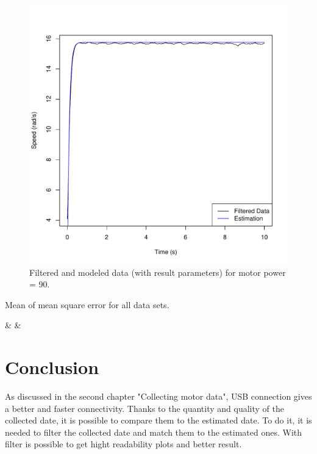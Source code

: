 \documentclass[a4paper,12pt,oneside]{article}
\begin{document}
\begin{figure}[h]%
	\centering
	\includegraphics[width=\columnwidth]{../motor_data/plots/result_estimation/90}
	\caption{Filtered and modeled data (with result parameters) for motor power = 90.}%
	\label{fig:fit_res}%
\end{figure}

\begin{table}
\centering
\caption{Mean of mean square error for all data sets.}
\label{table:square_error}
%
{\p & \rg & \rr}%
\end{table}

\section{Conclusion}
As discussed in the second chapter "Collecting motor data", USB connection gives a better and faster connectivity. Thanks to the quantity and quality of the collected date, it is possible to compare them to the estimated date. To do it, it is needed to filter the collected date and match them to the estimated ones. With filter is possible to get hight readability plots and better result.
\end{document}
